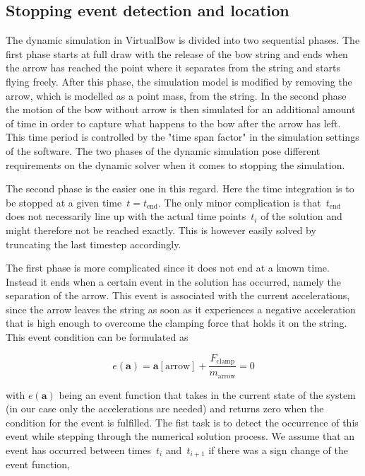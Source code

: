 \newpage
\subsection{Stopping event detection and location}

The dynamic simulation in VirtualBow is divided into two sequential phases.
The first phase starts at full draw with the release of the bow string and ends when the arrow has reached the point where it separates from the string and starts flying freely.
After this phase, the simulation model is modified by removing the arrow, which is modelled as a point mass, from the string.
In the second phase the motion of the bow without arrow is then simulated for an additional amount of time in order to capture what happens to the bow after the arrow has left.
This time period is controlled by the "time span factor" in the simulation settings of the software.
The two phases of the dynamic simulation pose different requirements on the dynamic solver when it comes to stopping the simulation.

The second phase is the easier one in this regard.
Here the time integration is to be stopped at a given time~$t = t_\mathrm{end}$.
The only minor complication is that~$t_\mathrm{end}$ does not necessarily line up with the actual time points~$t_{i}$ of the solution and might therefore not be reached exactly.
This is however easily solved by truncating the last timestep accordingly.

The first phase is more complicated since it does not end at a known time.
Instead it ends when a certain event in the solution has occurred, namely the separation of the arrow.
This event is associated with the current accelerations, since the arrow leaves the string as soon as it experiences a negative acceleration that is high enough to overcome the clamping force that holds it on the string.
This event condition can be formulated as

\begin{equation}
e(\boldsymbol{a}) = \boldsymbol{a}[\mathrm{arrow}] + \frac{F_{\mathrm{clamp}}}{m_{\mathrm{arrow}}} = 0 \label{eq:event-function-arrow}
\end{equation}

with $e(\boldsymbol{a})$ being an event function that takes in the current state of the system (in our case only the accelerations are needed) and returns zero when the condition for the event is fulfilled.
The fist task is to detect the occurrence of this event while stepping through the numerical solution process.
We assume that an event has occurred between times~$t_{i}$ and~$t_{i+1}$ if there was a sign change of the event function,

